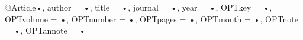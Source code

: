 @Article{•,
author = {•},
title = {•},
journal = {•},
year = {•},
OPTkey = {•},
OPTvolume = {•},
OPTnumber = {•},
OPTpages = {•},
OPTmonth = {•},
OPTnote = {•},
OPTannote = {•}
}
